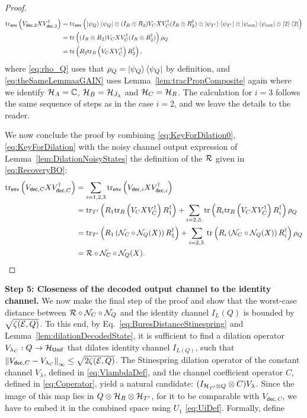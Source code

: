 \documentclass[10pt]{article}
\newcommand{\SOUT}{\mathrm{out}}
\newcommand{\tr}{\mathrm{tr}}
\newcommand{\C}{\mathbb{C}}
\newcommand{\p}[1]{\left(#1\right)}
\newcommand{\norm}[1]{\left\|#1\right\|}
\newcommand{\s}[1]{\mathsf{#1}}
\begin{document}
\begin{proof}
    \begin{align}
        \tr_{\s{env}}\p{V_{\s{dec},2}XV_{\s{dec},2}^\dag}\nonumber&\nonumber=\tr_{\s{env}}\p{\ket{\psi_{Q}} \bra{\psi_{Q}} \otimes (I_{R}\otimes R_2)V_C X V_C^\dag(I_{R}\otimes R_2^\dag)\otimes  \ket{\psi_{T'}} \bra{\psi_{T'}} \otimes \ket{\psi_{\SOUT}}\bra{\psi_{\SOUT}}\otimes \ket{2}\bra{2} }\\
        &\label{eq:rho_Q}= \tr\p{(I_{R}\otimes R_2)V_C X V_C^\dag(I_{R}\otimes R_2^\dag)}\rho_Q\\
        &=\tr\p{R_2 \tr_{R}\p{V_C X V_C^\dag} R_2^\dag},\label{eq:theSameLemmaaGAIN}
    \end{align}
    where \eqref{eq:rho_Q} uses that $\rho_{Q}=\ket{\psi_Q}\bra{\psi_Q}$ by definition, and \eqref{eq:theSameLemmaaGAIN} uses Lemma~\ref{lem:tracPropComposite} again where we identify $\calH_{A}=\C$, ${\cal H}_B={\cal H}_{J_{\lambda}}$ and ${\cal H}_C={\cal H}_R$. The calculation for $i=3$ follows the same sequence of steps as in the case $i=2$, and we leave the details to the reader. 
    
    We now conclude the proof by combining \eqref{eq:KeyForDilation0}, \eqref{eq:KeyForDilation} with   the noisy channel output expression of Lemma~\ref{lem:DilationNoisyStates} the definition of the ${\cal R}$ given in \eqref{eq:RecoveryBO}:
    \begin{align*}
        \tr_{{\s{env}}}\p{V_{\s{dec},C}X V_{\s{dec},C}^\dag}&=\sum_{i=1,2,3}\tr_{{\s{env}}}\p{V_{\s{dec},i}X V_{\s{dec},i}^\dag}\\&
        =\tr_{{T'}}\p{R_1 \tr_{R}\p{V_C X V_C^\dag} R_1^\dag}  +\sum_{i=2,3.}
        \tr\p{R_i \tr_{R}\p{V_C X V_C^\dag} R_i^\dag}\rho_Q  \\
        &=\tr_{{T'}}\p{R_1  \p{\calN_{C}\circ \calN_{Q}(X)} R_1^\dag}  +\sum_{i=2,3.}
        \tr\p{R_i  \p{\calN_{C}\circ \calN_{Q}(X)} R_i^\dag}\rho_Q \\
       &= \calR\circ \calN_{C}\circ \calN_{Q}(X).
    \end{align*}
      \end{proof}
    \noindent\textbf{Step 5: Closeness of the decoded output channel to the identity channel.} We now make the final step of the proof and show that the worst-case distance between ${\cal R} \circ {\cal N}_C\circ {\cal N}_Q$ and the identity channel $I_L(Q)$ is bounded by $\sqrt{ \zeta({\cal E},Q)}$. To this end, by Eq.~\eqref{eq:BuresDistanceStinespring} and Lemma~\ref{lem:dilationDecodedState}, it is sufficient to find a dilation operator $V_{\lambda_C}:Q\to \calH_{\s{Unif}}$ that dilates identity channel $I_{L(Q)}$, such that $\norm{V_{\s{dec},C}-V_{\lambda_C}}_{\infty}\leq \sqrt{2\zeta(\calE,Q)}$. The Stinespring dilation operator of the constant channel $V_{\lambda}$, defined in \eqref{eq:VlambdaDef}, and the channel coefficient operator $C$, defined in \eqref{eq:Coperator}, yield a natural candidate: $(I_{{\cal H}_{T'}\otimes Q}\otimes C) V_{\lambda}$. Since the image of this map lies in $Q\otimes {\cal H}_R\otimes {\cal H}_{T'}$, for it to be comparable with $V_{\s{dec},C}$, we have to embed it in the combined space using $U_1$ \eqref{eq:UiDef}. Formally, define
\end{document}
